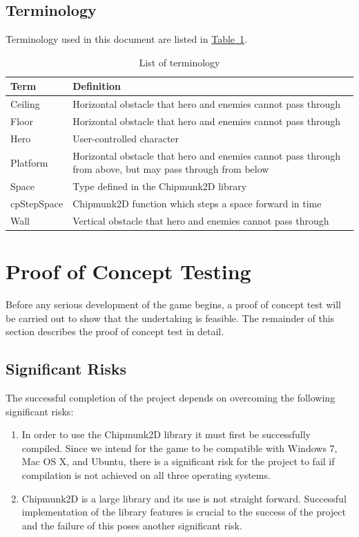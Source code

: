 \documentclass[12pt, titlepage]{article}
\begin{document}
\subsection{Terminology}
Terminology used in this document are listed in \hyperref[tab:terminology]{Table~\ref*{tab:terminology}}.
\begin{table}[ht]
\caption{List of terminology} \label{tab:terminology}
\begin{tabularx}{\textwidth}{p{3cm}X}
\toprule {\bf Term} & {\bf Definition}\\
\midrule
Ceiling & Horizontal obstacle that hero and enemies cannot pass through\\
Floor & Horizontal obstacle that hero and enemies cannot pass through\\
Hero & User-controlled character\\
Platform & Horizontal obstacle that hero and enemies cannot pass through from above, but may pass through from below\\
Space & Type defined in the Chipmunk2D library\\
cpStepSpace & Chipmunk2D function which steps a space forward in time\\
Wall & Vertical obstacle that hero and enemies cannot pass through\\
\bottomrule
\end{tabularx}
\end{table}


\section{Proof of Concept Testing}
\label{sec:poc}
Before any serious development of the game begins, a proof of concept test will be carried out to show that the undertaking is feasible.  The remainder of this section describes the proof of concept test in detail.

\subsection{Significant Risks}
The successful completion of the project depends on overcoming the following significant risks:
\begin{enumerate}
  \item In order to use the Chipmunk2D library it must first be successfully compiled.  Since we intend for the game to be compatible with Windows 7, Mac OS X, and Ubuntu, there is a significant risk for the project to fail if compilation is not achieved on all three operating systems.
  \item Chipmunk2D is a large library and its use is not straight forward.  Successful implementation of the library features is crucial to the success of the project and the failure of this poses another significant risk.
\end{enumerate}
\end{document}
